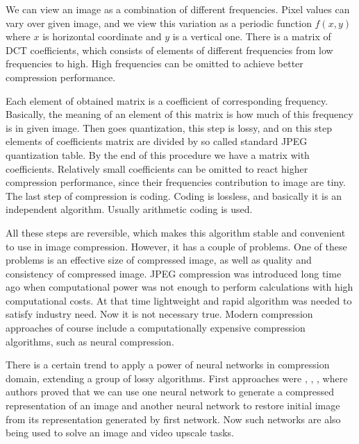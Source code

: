 We can view an image as a combination of different frequencies. Pixel values can vary over given image, and we view this variation as a periodic function $f(x, y)$ where $x$ is horizontal coordinate and $y$ is a vertical one. There is a matrix of DCT coefficients, which consists of elements of different frequencies from low frequencies to high. High frequencies can be omitted to achieve better compression performance.

Each element of obtained matrix is a coefficient of corresponding frequency. Basically, the meaning of an element of this matrix is how much of this frequency is in given image. Then goes quantization, this step is lossy, and on this step elements of coefficients matrix are divided by so called standard JPEG quantization table. By the end of this procedure we have a matrix with coefficients. Relatively small coefficients can be omitted to react higher compression performance, since their frequencies contribution to image are tiny. The last step of compression is coding. Coding is lossless, and basically it is an independent algorithm. Usually arithmetic coding is used.

All these steps are reversible, which makes this algorithm stable and convenient to use in image compression. However, it has a couple of problems. One of these problems is an effective size of compressed image, as well as quality and consistency of compressed image. JPEG compression was introduced long time ago when computational power was not enough to perform calculations with high computational costs. At that time lightweight and rapid algorithm was needed to satisfy industry need. Now it is not necessary true. Modern compression approaches of course include a computationally expensive compression algorithms, such as neural compression.

There is a certain trend to apply a power of neural networks in compression domain, extending a group of lossy algorithms. First approaches were \cite{Balle_Laparra_Simoncelli_2017}, \cite{Theis_Shi_Cunningham_Huszar_2017}, \cite{Toderici_Vincent_Johnston_Hwang_Minnen_Shor_Covell_2017}, where authors proved that we can use one neural network to generate a compressed representation of an image and another neural network to restore initial image from its representation generated by first network. Now such networks are also being used to solve an image and video upscale tasks.

